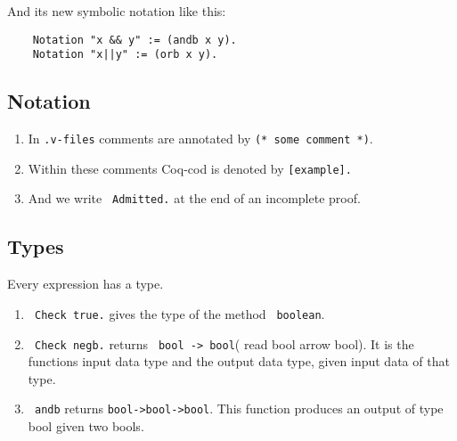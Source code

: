     And its new symbolic notation like this:
    \begin{lstlisting}
    Notation "x && y" := (andb x y).
    Notation "x||y" := (orb x y).
    \end{lstlisting}
     
     \subsection{Notation}
    \begin{enumerate}
     \item In \texttt{.v-files} comments are annotated by \lstinline!(* some comment *)!. 
     \item Within these comments Coq-cod is denoted by \lstinline![example].! 
     \item And we write \lstinline! Admitted.! at the end of an incomplete proof.    
     \end{enumerate}
     
     \subsection{Types}
     Every expression has a type.
     \begin{enumerate}
     \item  \lstinline! Check true.! gives the type of the method \lstinline! boolean!.
     \item \lstinline! Check negb.! returns \lstinline! bool -> bool!( read \glqq bool arrow bool\grqq).
      It is the functions input data type and the output data type, given input data of that type.
      \item \lstinline! andb! returns \lstinline!bool->bool->bool!. This function produces an output of type bool given two bools.
     \end{enumerate}
     
     
     